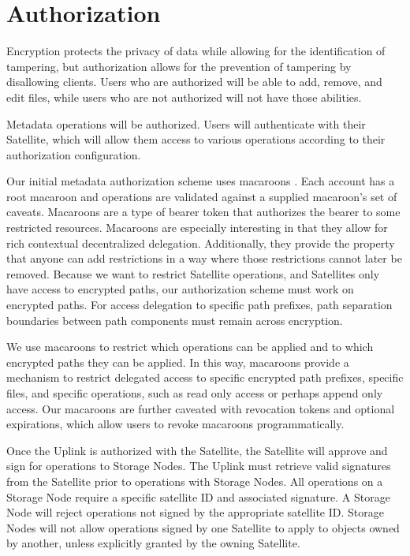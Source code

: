 \documentclass[8pt,fleqn,openany]{book}
\begin{document}
\section{Authorization}\label{sec:concrete-authorization}

Encryption protects the privacy of data while allowing for the identification
of tampering, but authorization allows for the prevention of tampering by
disallowing clients. Users who are authorized will be able to add, remove,
and edit files, while users who are not authorized will not have those abilities.

Metadata operations will be authorized. Users will authenticate with
their Satellite, which will allow them access to various operations according
to their authorization configuration.

Our initial metadata authorization scheme uses macaroons \cite{macaroons}.
Each account has a root macaroon and operations are validated against a supplied
macaroon's set of caveats. Macaroons are a type of bearer token that authorizes
the bearer to some restricted resources. Macaroons are especially interesting
in that they allow for rich contextual decentralized delegation. Additionally, they
provide the property that anyone can add restrictions in a way where those
restrictions cannot later be removed.
Because we want to restrict Satellite operations, and Satellites only have access
to encrypted paths, our authorization scheme must work on encrypted paths. For
access delegation to specific path prefixes, path separation boundaries between
path components must remain across encryption.

We use macaroons to restrict which operations can be applied and to which
encrypted paths they can be applied. In this way, macaroons provide a
mechanism to restrict delegated access to specific encrypted path prefixes,
specific files, and specific operations, such as read only access or perhaps
append only access.
Our macaroons are further caveated with revocation tokens and optional
expirations, which allow users to revoke macaroons programmatically.

Once the Uplink is authorized with the Satellite, the Satellite will approve
and sign for operations to Storage Nodes.
The Uplink must retrieve valid signatures from the Satellite
prior to operations with Storage Nodes.
All operations on a Storage Node require a specific satellite ID and associated
signature.
A Storage Node will reject operations not signed by the appropriate
satellite ID. Storage Nodes will not allow
operations signed by one Satellite to apply to objects owned by another, unless
explicitly granted by the owning Satellite.
\end{document}
